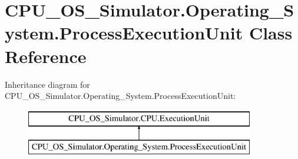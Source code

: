 \hypertarget{class_c_p_u___o_s___simulator_1_1_operating___system_1_1_process_execution_unit}{}\section{C\+P\+U\+\_\+\+O\+S\+\_\+\+Simulator.\+Operating\+\_\+\+System.\+Process\+Execution\+Unit Class Reference}
\label{class_c_p_u___o_s___simulator_1_1_operating___system_1_1_process_execution_unit}
Inheritance diagram for C\+P\+U\+\_\+\+O\+S\+\_\+\+Simulator.\+Operating\+\_\+\+System.\+Process\+Execution\+Unit\+:\begin{figure}[H]
\begin{center}
\leavevmode
\includegraphics[height=2.000000cm]{class_c_p_u___o_s___simulator_1_1_operating___system_1_1_process_execution_unit}
\end{center}
\end{figure}
